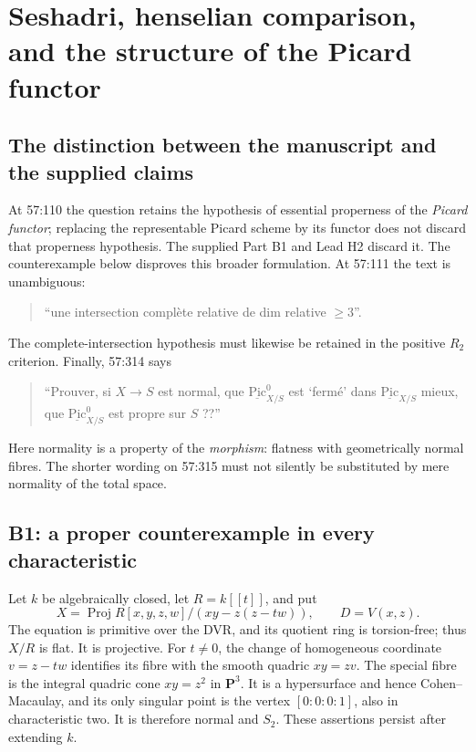 \section{Seshadri, henselian comparison, and the structure of the Picard functor}
\label{sec:bce}

\subsection{The distinction between the manuscript and the supplied claims}

At 57:110 the question retains the hypothesis of essential properness of the
\emph{Picard functor}; replacing the representable Picard scheme by its functor
does not discard that properness hypothesis. The supplied Part B1 and Lead H2
discard it. The counterexample below disproves this broader formulation.
At 57:111 the text is unambiguous:
\begin{quote}
``une intersection compl\`ete relative de dim relative $\geq3$''.
\end{quote}
The complete-intersection hypothesis must likewise be retained in the positive
$R_2$ criterion. Finally, 57:314 says
\begin{quote}
``Prouver, si $X\to S$ est normal, que $\underline{\mathrm{Pic}}^0_{X/S}$ est
`ferm\'e' dans $\underline{\mathrm{Pic}}_{X/S}$ mieux, que
$\underline{\mathrm{Pic}}^0_{X/S}$ est propre sur $S$ ??''
\end{quote}
Here normality is a property of the \emph{morphism}: flatness with geometrically
normal fibres. The shorter wording on 57:315 must not silently be substituted
by mere normality of the total space.

\subsection{B1: a proper counterexample in every characteristic}

Let $k$ be algebraically closed, let $R=k[[t]]$, and put
\[
 X=\operatorname{Proj}R[x,y,z,w]/(xy-z(z-tw)),\qquad D=V(x,z).
\]
The equation is primitive over the DVR, and its quotient ring is torsion-free;
thus $X/R$ is flat. It is projective. For $t\ne0$, the change of homogeneous
coordinate $v=z-tw$ identifies its fibre with the smooth quadric $xy=zv$.
The special fibre is the integral quadric cone $xy=z^2$ in $\mathbf P^3$.
It is a hypersurface and hence Cohen--Macaulay, and its only singular point is
the vertex $[0:0:0:1]$, also in characteristic two. It is therefore normal and
$S_2$. These assertions persist after extending $k$.

